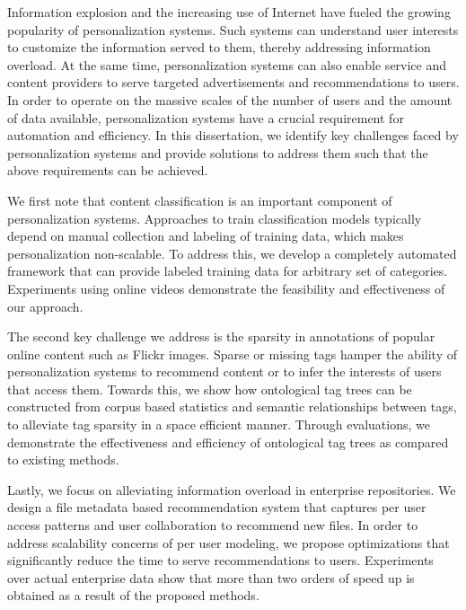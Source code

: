 \documentclass[12pt]{ucsddissertation}
\begin{document}
\begin{dissertationabstract}


Information explosion and the increasing use of Internet have fueled the growing popularity of personalization systems. Such systems can understand user interests to customize the information served to them, thereby addressing information overload. At the same time, personalization systems can also enable service and content providers to serve targeted advertisements and recommendations to users. In order to operate on the massive scales of the number of users and the amount of data available, personalization systems have a crucial requirement for automation and efficiency. In this dissertation, we identify key challenges faced by personalization systems and provide solutions to address them such that the above requirements can be achieved. 

We first note that content classification is an important component of personalization systems. Approaches to train classification models typically depend on manual collection and labeling of training data, which makes personalization non-scalable. To address this, we develop a completely automated framework that can provide labeled training data for arbitrary set of categories. Experiments using online videos demonstrate the feasibility and effectiveness of our approach. 


The second key challenge we address is the sparsity in annotations of popular online content such as Flickr images. Sparse or missing tags hamper the ability of personalization systems to recommend content or to infer the interests of users that access them. Towards this, we show how ontological tag trees can be constructed from corpus based statistics and semantic relationships between tags, to alleviate tag sparsity in a space efficient manner. Through evaluations, we demonstrate the effectiveness and efficiency of ontological tag trees as compared to existing methods. 


Lastly, we focus on alleviating information overload in enterprise repositories. We design a file metadata based recommendation system that captures per user access patterns and user collaboration to recommend new files. In order to address scalability concerns of per user modeling, we propose optimizations that significantly reduce the time to serve recommendations to users. Experiments over actual enterprise data show that more than two orders of speed up is obtained as a result of the proposed methods. 



\end{dissertationabstract}
\end{document}
